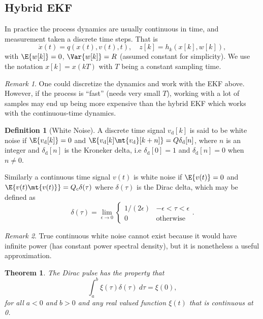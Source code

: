 \documentclass[]{hsrzf}
\theoremstyle{plain}
\newtheorem{thm}{Theorem}[section]
\theoremstyle{definition}
\newtheorem{defn}{Definition}[section]
\theoremstyle{remark}
\newtheorem*{remark}{Remark}
\begin{document}
\subsection{Hybrid EKF}

In practice the process dynamics are usually continuous in time, and
measurement taken a discrete time steps. That is
\[
  \dot{x}(t) = q(x(t), v(t), t),
  \quad z[k] = h_k(x[k], w[k]),
\]
with $\E{w[k]} = 0$, $\Var{w[k]} = R$ (assumed constant for simplicity). We
use the notation $x[k] = x(kT)$ with $T$ being a constant sampling time.

\begin{remark}
  One could discretize the dynamics and work with the EKF above. However, if
  the process is ``fast'' (needs very small $T$), working with a lot of
  samples may end up being more expensive than the hybrid EKF which works with
  the continuous-time dynamics.
\end{remark}

\begin{defn}[White Noise]
  A discrete time signal $v_\mathrm{d}[k]$ is said to be white noise if
  $\E{v_\mathrm{d}[k]} = 0$ and $\E{v_\mathrm{d}[k] \mt{v_\mathrm{d}}[k+n]} =
  Q\delta_\mathrm{d}[n]$, where $n$ is an integer and $\delta_\mathrm{d}[n]$
  is the Kroneker delta, i.e $\delta_\mathrm{d}[0] = 1$ and
  $\delta_\mathrm{d}[n] = 0$ when $n \neq 0$.

  Similarly a continuous time signal $v(t)$ is white noise if $\E{v(t)} = 0$
  and $\E{v(t) \mt{v(t)}} = Q_c \delta(\tau)$ where $\delta(\tau)$ is the
  Dirac delta, which may be defined as
  \[
    \delta(\tau) = \lim_{\epsilon \to 0} \begin{cases}
      1/(2\epsilon) & -\epsilon < \tau < \epsilon \\
      0 & \text{otherwise}
    \end{cases}.
  \]
\end{defn}

\begin{remark}
  True continuous white noise cannot exist because it would have infinite
  power (has constant power spectral density), but it is nonetheless a useful
  approximation.
\end{remark}

\begin{thm}
  The Dirac pulse has the property that
  \[
    \int_a^b \xi(\tau) \delta(\tau) ~d\tau = \xi(0),
  \]
  for all $a < 0$ and $b > 0$ and any real valued function $\xi(t)$ that is
  continuous at 0.
\end{thm}
\end{document}
